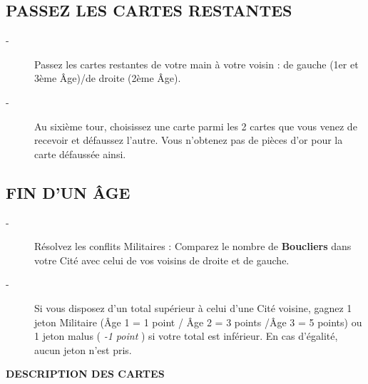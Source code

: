 \documentclass{scrartcl}%
\begin{document}
%
\subsection{ PASSEZ LES CARTES RESTANTES
}%
\label{subsec:PASSEZLESCARTESRESTANTES}%
\begin{description}%
\item[{-} ]%
%
 Passez les cartes restantes de votre main à votre voisin : de gauche (1er et 3ème Âge)/de droite (2ème Âge).
%
\item[{-} ]%
%
 Au sixième tour, choisissez une carte parmi les 2 cartes que vous venez de recevoir et défaussez l'autre. Vous n'obtenez pas de pièces d'or pour la carte défaussée ainsi.
%
\end{description}

%
\subsection{ FIN D’UN ÂGE
}%
\label{subsec:FINDUNGE}%
\begin{description}%
\item[{-} ]%
%
 Résolvez les conflits Militaires : Comparez le nombre de %
\textbf{Boucliers}%
\textit{ }%
 dans votre Cité avec celui de vos voisins de droite et de gauche.
%
\item[{-} ]%
%
 Si vous disposez d’un total supérieur à celui d’une Cité voisine, gagnez 1 jeton Militaire (Âge 1 = 1 point / Âge 2 = 3 points /Âge 3 = 5 points) ou 1 jeton malus (%
\textit{{-}1 point}%
) si votre total est inférieur. En cas d'égalité, aucun jeton n’est pris.
%
\end{description}%
\textbf{DESCRIPTION DES CARTES}%
\end{document}
